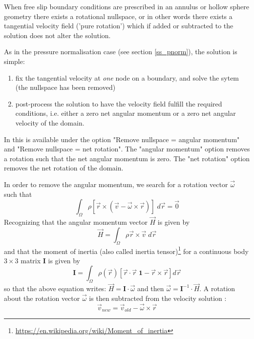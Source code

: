 
When free slip boundary conditions are prescribed in an annulus or
hollow sphere geometry there exists a rotational nullspace, or in other words there exists
a tangential velocity field ('pure rotation') which if added or subtracted to the solution 
does not alter the solution. 

As in the pressure normalisation case (see section \ref{ss_pnorm}), the solution is simple:
\begin{enumerate}
\item fix the tangential velocity at {\it one} node on a boundary, and solve the sytem (the nullspace 
has been removed)
\item post-process the solution to have the velocity field fulfill the required conditions, i.e.
either a zero net angular momentum or a zero net angular velocity of the domain. 
\end{enumerate}

\begin{remark}
In \aspect{} this is available under the option 
"Remove nullspace = angular momentum" and "Remove nullspace = net rotation".
The "angular momentum" option removes a rotation such that the net angular momentum is zero.
The "net rotation" option removes the net rotation of the domain.
\end{remark}

In order to remove the angular momentum, we search for a rotation
vector ${\vec \omega}$ such that
\begin{equation}
\int_\Omega \rho[{\vec r} \times ({\vec v}-{\vec \omega} \times {\vec r})] \; d\vec r= \vec 0
\end{equation}
Recognizing that the angular momentum vector ${\vec H}$ is given by
\begin{equation}
{\vec H} = \int_\Omega \rho{\vec r} \times {\vec v}\; d\vec r
\end{equation}
and that the moment of inertia
(also called inertia tensor)\footnote{\url{https://en.wikipedia.org/wiki/Moment\_of\_inertia}}
 for a continuous body 
 $3\times3$ matrix ${\bm I}$ is given by
\begin{equation}
{\bm I}= 
\int_\Omega \rho(\vec r) [\vec r\cdot\vec r \; \bm 1 - \vec r \times \vec r  ] d\vec r 
\end{equation}
so that the above equation writes:
$
{\vec H}={\bm I}\cdot {\vec \omega}
$
and then ${\vec \omega}={\bm I}^{-1} \cdot {\vec H}$.
A rotation about the rotation vector ${\vec \omega}$ is then subtracted from the velocity 
solution \cite[eq. 26]{zhmt08}:
\begin{equation}
\vec v_{new} = \vec v_{old} - \vec \omega \times \vec r 
\end{equation}

